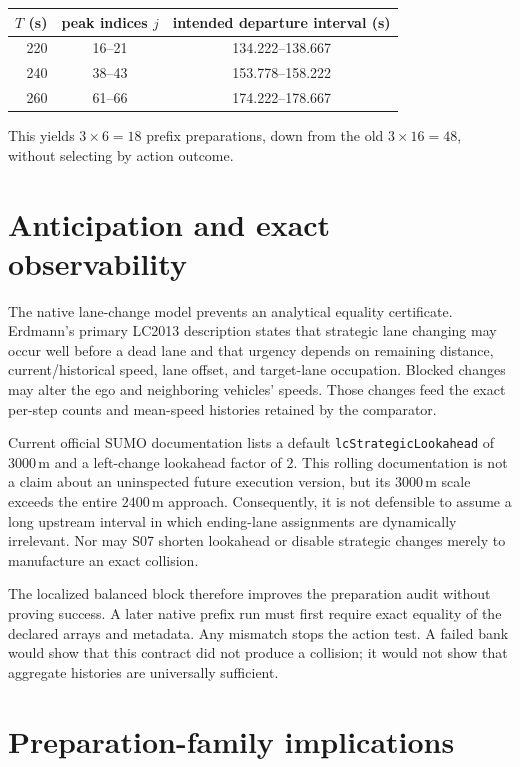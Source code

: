 \documentclass[11pt]{article}
\newcommand{\unit}[1]{\,\mathrm{#1}}
\begin{document}
\begin{table}[h]
\centering
\begin{tabular}{@{}rcc@{}}
\toprule
$T$ (s) & peak indices $j$ & intended departure interval (s) \\
\midrule
220 & 16--21 & 134.222--138.667 \\
240 & 38--43 & 153.778--158.222 \\
260 & 61--66 & 174.222--178.667 \\
\bottomrule
\end{tabular}
\end{table}

This yields $3\times6=18$ prefix preparations, down from the old
$3\times16=48$, without selecting by action outcome.

\section{Anticipation and exact observability}

The native lane-change model prevents an analytical equality certificate.
Erdmann's primary LC2013 description states that strategic lane changing may
occur well before a dead lane and that urgency depends on remaining distance,
current/historical speed, lane offset, and target-lane occupation.  Blocked
changes may alter the ego and neighboring vehicles' speeds.  Those changes feed
the exact per-step counts and mean-speed histories retained by the comparator.

Current official SUMO documentation lists a default
\texttt{lcStrategicLookahead} of $3000\unit{m}$ and a left-change lookahead
factor of $2$.  This rolling documentation is not a claim about an uninspected
future execution version, but its $3000\unit{m}$ scale exceeds the entire
$2400\unit{m}$ approach.  Consequently, it is not defensible to assume a long
upstream interval in which ending-lane assignments are dynamically irrelevant.
Nor may S07 shorten lookahead or disable strategic changes merely to manufacture
an exact collision.

The localized balanced block therefore improves the preparation audit without
proving success.  A later native prefix run must first require exact equality of
the declared arrays and metadata.  Any mismatch stops the action test.  A failed
bank would show that this contract did not produce a collision; it would not show
that aggregate histories are universally sufficient.

\section{Preparation-family implications}
\end{document}
